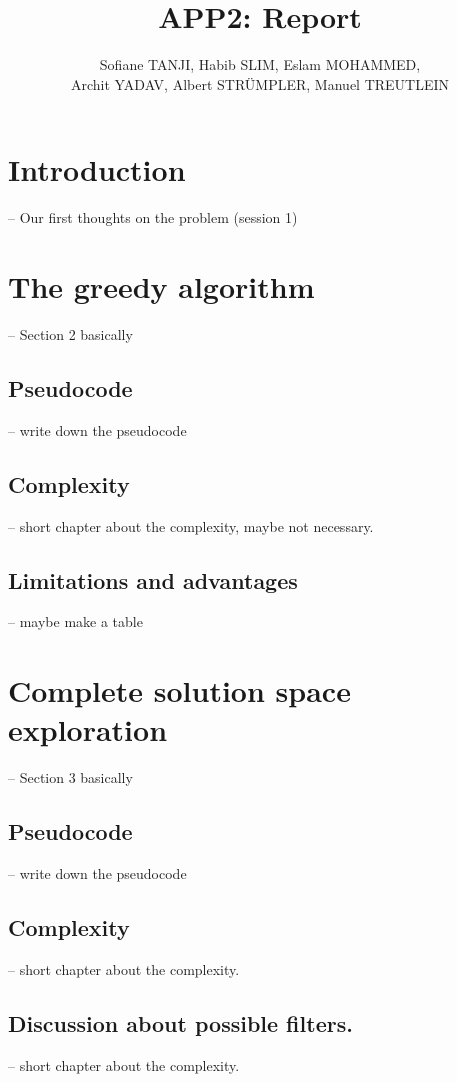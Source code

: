 \documentclass[parskip=full]{scrartcl}
\title{APP2: Report}
\author{Sofiane TANJI, Habib SLIM, Eslam MOHAMMED,\\ Archit YADAV, Albert STRÜMPLER, Manuel TREUTLEIN}
\begin{document}
\maketitle

\section{Introduction}
-- Our first thoughts on the problem (session 1)

\section{The greedy algorithm}
-- Section 2 basically

\subsection{Pseudocode}
-- write down the pseudocode

\subsection{Complexity}
-- short chapter about the complexity, maybe not necessary.

\subsection{Limitations and advantages}
-- maybe make a table


\section{Complete solution space exploration}
-- Section 3 basically

\subsection{Pseudocode}
-- write down the pseudocode

\subsection{Complexity}
-- short chapter about the complexity.

\subsection{Discussion about possible filters.}
-- short chapter about the complexity.

\printnoidxglossaries
\end{document}
